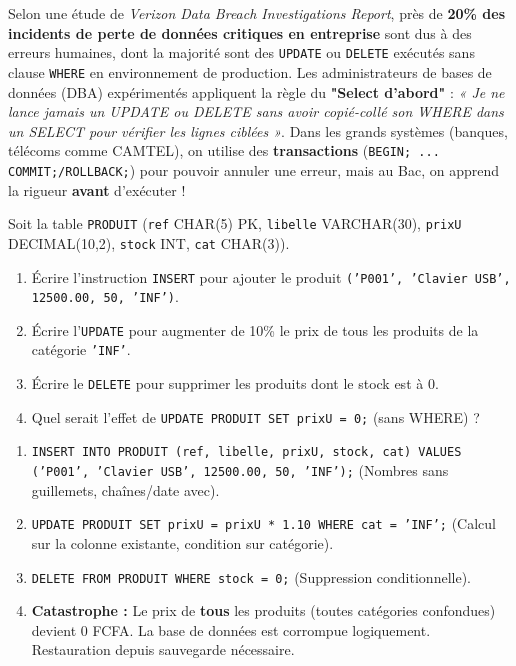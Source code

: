 \documentclass[11pt]{article}
\begin{document}
\begin{savaistu}
Selon une étude de \emph{Verizon Data Breach Investigations Report}, près de \textbf{20\% des incidents de perte de données critiques en entreprise} sont dus à des erreurs humaines, dont la majorité sont des \texttt{UPDATE} ou \texttt{DELETE} exécutés sans clause \texttt{WHERE} en environnement de production. Les administrateurs de bases de données (DBA) expérimentés appliquent la règle du \textbf{"Select d'abord"} : \textit{« Je ne lance jamais un UPDATE ou DELETE sans avoir copié-collé son WHERE dans un SELECT pour vérifier les lignes ciblées »}. Dans les grands systèmes (banques, télécoms comme CAMTEL), on utilise des \textbf{transactions} (\texttt{BEGIN; ... COMMIT;/ROLLBACK;}) pour pouvoir annuler une erreur, mais au Bac, on apprend la rigueur \textbf{avant} d'exécuter !
\end{savaistu}

\begin{exercice}
Soit la table \texttt{PRODUIT} (\texttt{ref} CHAR(5) PK, \texttt{libelle} VARCHAR(30), \texttt{prixU} DECIMAL(10,2), \texttt{stock} INT, \texttt{cat} CHAR(3)).
\begin{enumerate}
    \item Écrire l'instruction \texttt{INSERT} pour ajouter le produit \texttt{('P001', 'Clavier USB', 12500.00, 50, 'INF')}.
    \item Écrire l'\texttt{UPDATE} pour augmenter de 10\% le prix de tous les produits de la catégorie \texttt{'INF'}.
    \item Écrire le \texttt{DELETE} pour supprimer les produits dont le stock est à 0.
    \item Quel serait l'effet de \texttt{UPDATE PRODUIT SET prixU = 0;} (sans WHERE) ?
\end{enumerate}
\end{exercice}

\begin{corrige}[Exercice n°1]
\begin{enumerate}
    \item \texttt{INSERT INTO PRODUIT (ref, libelle, prixU, stock, cat) VALUES ('P001', 'Clavier USB', 12500.00, 50, 'INF');} (Nombres sans guillemets, chaînes/date avec).
    \item \texttt{UPDATE PRODUIT SET prixU = prixU * 1.10 WHERE cat = 'INF';} (Calcul sur la colonne existante, condition sur catégorie).
    \item \texttt{DELETE FROM PRODUIT WHERE stock = 0;} (Suppression conditionnelle).
    \item \textbf{Catastrophe :} Le prix de \textbf{tous} les produits (toutes catégories confondues) devient 0 FCFA. La base de données est corrompue logiquement. Restauration depuis sauvegarde nécessaire.
\end{enumerate}
\end{corrige}
\end{document}

